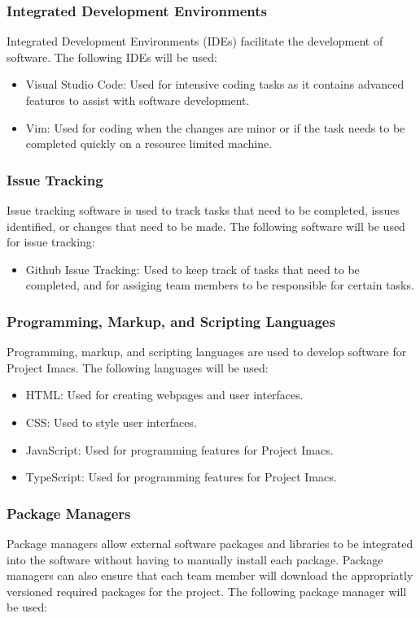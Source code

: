 \documentclass{article}
\begin{document}
\subsubsection{Integrated Development Environments}
Integrated Development Environments (IDEs) facilitate the development of software. The following IDEs will be used:

\begin{itemize}
\item Visual Studio Code: Used for intensive coding tasks as it contains advanced features to assist with software development.
\item Vim: Used for coding when the changes are minor or if the task needs to be completed quickly on a resource limited machine.
\end{itemize}

\subsubsection{Issue Tracking}
Issue tracking software is used to track tasks that need to be completed, issues identified, or changes that need to be made. The following software will be used for issue tracking:

\begin{itemize}
\item Github Issue Tracking: Used to keep track of tasks that need to be completed, and for assiging team members to be responsible for certain tasks.
\end{itemize}

\subsubsection{Programming, Markup, and Scripting Languages}
Programming, markup, and scripting languages are used to develop software for Project Imacs. The following languages will be used:

\begin{itemize}
\item HTML: Used for creating webpages and user interfaces.
\item CSS: Used to style user interfaces.
\item JavaScript: Used for programming features for Project Imacs.
\item TypeScript: Used for programming features for Project Imacs.
\end{itemize}

\subsubsection{Package Managers}
Package managers allow external software packages and libraries to be integrated into the software without having to manually install each package. Package managers can also ensure that each team member will download the appropriatly versioned required packages for the project. The following package manager will be used:
\end{document}
